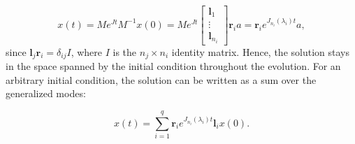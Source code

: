 \documentclass[../main.tex]{subfiles}
\begin{document}
\begin{equation}\label{eq:genmode}
    x(t) = Me^{Jt}M^{-1}x(0) = Me^{Jt} \begin{bmatrix} \boldsymbol{l}_1 \\ \vdots \\ \boldsymbol{l}_{n_i} \end{bmatrix} \boldsymbol{r}_ia = \boldsymbol{r}_i e^{J_{n_i}(\lambda_i)t} a,
\end{equation}
since $\boldsymbol{l}_j\boldsymbol{r}_i = \delta_{ij}I$, where $I$ is the $n_j\times n_i$ identity matrix. Hence, the solution stays in the space spanned by the initial condition throughout the evolution. For an arbitrary initial condition, the solution can be written as a sum over the generalized modes: 

\begin{equation}
    x(t) = \sum_{i=1}^q \boldsymbol{r}_i e^{J_{n_i}(\lambda_i)t} \boldsymbol{l}_i x(0).
\end{equation}
\end{document}
